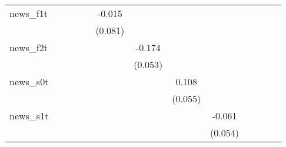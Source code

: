{\begin{tabular}{l*{12}{c}}
\addlinespace
news\_f1t    &                     &                     &                     &                     &      -0.015         &                     &                     &                     &                     &                     &                     &                     \\
            &                     &                     &                     &                     &     (0.081)         &                     &                     &                     &                     &                     &                     &                     \\
\addlinespace
news\_f2t    &                     &                     &                     &                     &                     &      -0.174\sym{***}&                     &                     &                     &                     &                     &                     \\
            &                     &                     &                     &                     &                     &     (0.053)         &                     &                     &                     &                     &                     &                     \\
\addlinespace
news\_s0t    &                     &                     &                     &                     &                     &                     &       0.108\sym{*}  &                     &                     &                     &                     &                     \\
            &                     &                     &                     &                     &                     &                     &     (0.055)         &                     &                     &                     &                     &                     \\
\addlinespace
news\_s1t    &                     &                     &                     &                     &                     &                     &                     &      -0.061         &                     &                     &                     &                     \\
            &                     &                     &                     &                     &                     &                     &                     &     (0.054)         &                     &                     &                     &                     \\

\end{tabular}}
